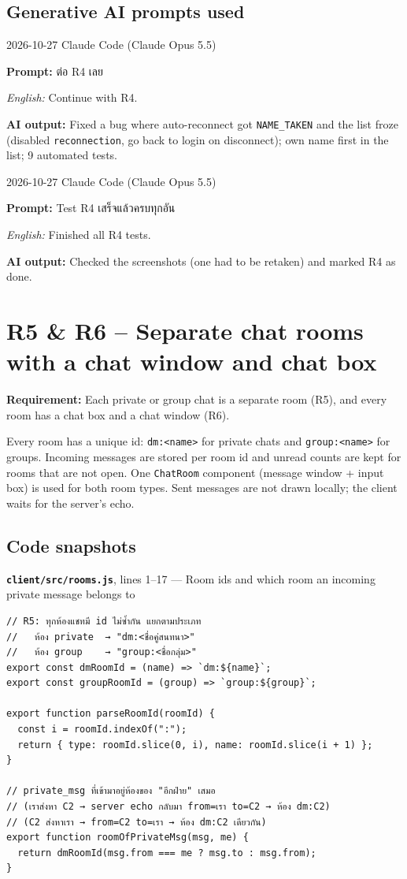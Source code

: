 \documentclass[11pt,a4paper]{article}
\newcommand{\code}[1]{\texttt{#1}}
\newcommand{\req}[1]{\begin{tcolorbox}[colback=accent!6,colframe=accent!60,boxrule=0.5pt,left=4pt,right=4pt,top=2pt,bottom=2pt]\textbf{Requirement:} #1\end{tcolorbox}}
\newcommand{\snap}[3]{\par\medskip\textbf{\code{#1}}, lines #2 --- #3}
\newcommand{\promptbox}[4]{%
\begin{tcolorbox}[colback=codebg,colframe=gray!50,boxrule=0.4pt,left=4pt,right=4pt,top=2pt,bottom=2pt]
{\small #1 \quad Claude Code (Claude Opus 5.5)}\par
\textbf{Prompt:} #2\par
\textit{English:} #3\par
\textbf{AI output:} #4
\end{tcolorbox}}
\begin{document}
\subsection*{Generative AI prompts used}
\promptbox{2026-10-27}{ต่อ R4 เลย}{Continue with R4.}{Fixed a bug where auto-reconnect got \code{NAME\_TAKEN} and the list froze (disabled \code{reconnection}, go back to login on disconnect); own name first in the list; 9 automated tests.}
\promptbox{2026-10-27}{Test R4 เสร็จแล้วครบทุกอัน}{Finished all R4 tests.}{Checked the screenshots (one had to be retaken) and marked R4 as done.}

\clearpage
\section{R5 \& R6 -- Separate chat rooms with a chat window and chat box}
\req{Each private or group chat is a separate room (R5), and every room has a chat box and a chat window (R6).}

Every room has a unique id: \code{dm:<name>} for private chats and
\code{group:<name>} for groups. Incoming messages are stored per room id and unread counts are kept
for rooms that are not open. One \code{ChatRoom} component (message window + input box) is used for
both room types. Sent messages are not drawn locally; the client waits for the server's echo.

\subsection*{Code snapshots}
\snap{client/src/rooms.js}{1--17}{Room ids and which room an incoming private message belongs to}
\begin{Verbatim}[firstnumber=1]
// R5: ทุกห้องแชทมี id ไม่ซ้ำกัน แยกตามประเภท
//   ห้อง private  → "dm:<ชื่อคู่สนทนา>"
//   ห้อง group    → "group:<ชื่อกลุ่ม>"
export const dmRoomId = (name) => `dm:${name}`;
export const groupRoomId = (group) => `group:${group}`;

export function parseRoomId(roomId) {
  const i = roomId.indexOf(":");
  return { type: roomId.slice(0, i), name: roomId.slice(i + 1) };
}

// private_msg ที่เข้ามาอยู่ห้องของ "อีกฝ่าย" เสมอ
// (เราส่งหา C2 → server echo กลับมา from=เรา to=C2 → ห้อง dm:C2)
// (C2 ส่งหาเรา → from=C2 to=เรา → ห้อง dm:C2 เดียวกัน)
export function roomOfPrivateMsg(msg, me) {
  return dmRoomId(msg.from === me ? msg.to : msg.from);
}
\end{Verbatim}
\end{document}
